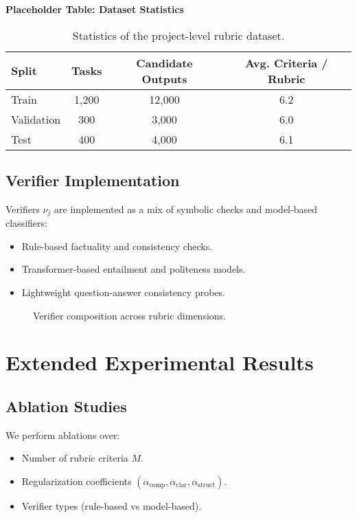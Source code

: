 \documentclass[sigconf]{acmart}
\begin{document}
\textbf{Placeholder Table: Dataset Statistics}
\begin{table}[h]
\centering
\caption{Statistics of the project-level rubric dataset.}
\begin{tabular}{lccc}
\toprule
Split & Tasks & Candidate Outputs & Avg. Criteria / Rubric \\
\midrule
Train & 1,200 & 12,000 & 6.2 \\
Validation & 300 & 3,000 & 6.0 \\
Test & 400 & 4,000 & 6.1 \\
\bottomrule
\end{tabular}
\label{tab:dataset-stats}
\end{table}

\subsection{Verifier Implementation}
Verifiers $\nu_j$ are implemented as a mix of symbolic checks and model-based classifiers:
\begin{itemize}
    \item Rule-based factuality and consistency checks.
    \item Transformer-based entailment and politeness models.
    \item Lightweight question-answer consistency probes.
\end{itemize}

\begin{figure}[h]
\centering
{}
\caption{Verifier composition across rubric dimensions.}
\label{fig:verifiers}
\end{figure}


\section{Extended Experimental Results}
\label{appendix:extended-results}

\subsection{Ablation Studies}
We perform ablations over:
\begin{itemize}
    \item Number of rubric criteria $M$.
    \item Regularization coefficients $(\alpha_{\mathrm{comp}}, \alpha_{\mathrm{clar}}, \alpha_{\mathrm{struct}})$.
    \item Verifier types (rule-based vs model-based).
\end{itemize}
\end{document}
